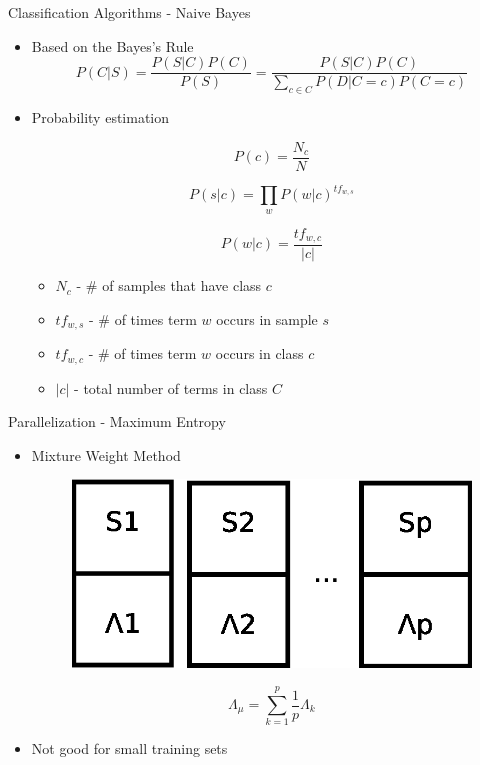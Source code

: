 \documentclass{beamer}
\begin{document}
\begin{frame}{Classification Algorithms - Naive Bayes}

\begin{itemize}
 \item Based on the Bayes's Rule
\[
P(C|S) = \frac{P (S|C) P (C)}{P(S)} = \frac{P (S|C) P (C)}{\sum_{c \in C} P(D|C=c)P(C=c)}
\] 
\item Probability estimation

\[
P(c) = \frac{N_c}{N}
\]

\[
P(s|c) = \prod_{w} P(w|c)^{tf_{w,s}}
\]

\[
P(w|c) = \frac{tf_{w,c}}{|c|}
\]

	\begin{itemize}
	\item $N_c$ - \# of samples that have class $c$
	\item $tf_{w,s}$ - \# of times term $w$ occurs in sample $s$
	\item $tf_{w,c}$ - \# of times term $w$ occurs in class $c$
	\item $|c|$ - total number of terms in class $C$
	\end{itemize}

\end{itemize}

\end{frame}


\begin{frame}{Parallelization - Maximum Entropy}

\begin{itemize}
 \item Mixture Weight Method \citep{conf/nips/MannMMSW09}

\begin{figure}[!htb]
  \centering
  \includegraphics[scale=0.50]{presentation/mixture_weight.eps}
\end{figure}

\[
\Lambda_{\mu} = \sum_{k=1}^{p} \frac{1}{p} \Lambda_{k}
\]

\item Not good for small training sets

\end{itemize}

\end{frame}
\end{document}

